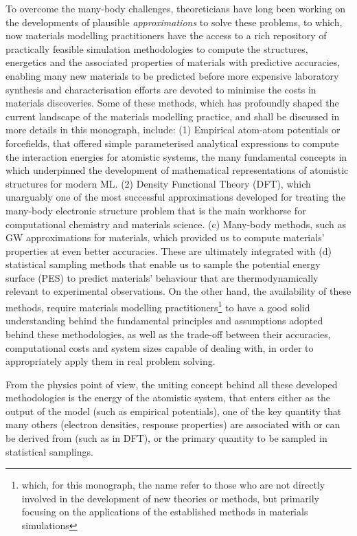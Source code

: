 To overcome the many-body challenges, theoreticians have long been working on the developments of plausible \emph{approximations} \cite{harrison2018review,kohn1999nobel,golze2019gw} to solve these problems, to which, now materials modelling practitioners have the access to a rich repository of practically feasible simulation methodologies to compute the structures, energetics and the associated properties of materials with predictive accuracies, enabling many new materials to be predicted before more expensive laboratory synthesis and characterisation efforts are devoted to minimise the costs in materials discoveries.\cite{Lv2015Weyl,pulido2017functional,Mounet2018Exfoliation,Sun2019TernaryNitrides} Some of these methods, which has profoundly shaped the current landscape of the materials modelling practice, and shall be discussed in more details in this monograph, include: (1) Empirical atom-atom potentials or forcefields,\cite{harrison2018review} that offered simple parameterised analytical expressions to compute the interaction energies for atomistic systems, the many fundamental concepts in which underpinned the development of mathematical representations of atomistic structures for modern ML.\cite{Musil2021StructuralRepresentations} (2) Density Functional Theory (DFT),\cite{kohn1999nobel} which unarguably one of the most successful approximations developed for treating the many-body electronic structure problem that is the main workhorse for computational chemistry and materials science. (c) Many-body methods, such as GW approximations\cite{golze2019gw} for materials, which provided us to compute materials' properties at even better accuracies. These are ultimately integrated with (d) statistical sampling methods that enable us to   sample  the potential energy surface (PES) to predict materials' behaviour that are thermodynamically relevant to experimental observations. On the other hand, the availability of these methods, require materials modelling practitioners\footnote{which, for this monograph, the name refer to those who are not directly involved in the development of new theories or methods, but primarily focusing on the applications of the established methods in materials simulations}  to have a good solid understanding behind the fundamental principles and assumptions adopted behind these methodologies, as well as the trade-off between their accuracies, computational costs and system sizes capable of dealing with, in order to appropriately apply them in real problem solving.

From the physics point of view, the uniting concept behind all these developed methodologies is the energy of the atomistic system, that enters either as the  output of the model (such as empirical potentials), one of the key quantity that many others (electron densities, response properties) are associated with or can be derived from (such as in DFT), or the primary quantity to be sampled in statistical samplings. 

